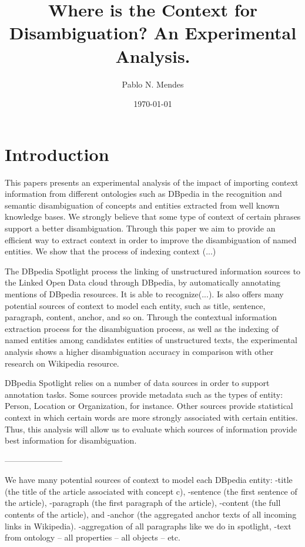 \documentclass[10pt,a4paper]{article}
\title{Where is the Context for Disambiguation? An Experimental Analysis.}
\author{Pablo N. Mendes}
\date{\today}
\begin{document}
\maketitle

\begin{abstract}
\end{abstract}

\section{Introduction}

This papers presents an experimental analysis of the impact of importing context information from different ontologies such as DBpedia in the recognition and semantic disambiguation of concepts and entities extracted from well known knowledge bases. We strongly believe that some type of context  of certain phrases support  a better disambiguation. Through this paper we aim to provide an efficient way to extract context in order to improve the disambiguation of named entities. We show that the process of  indexing context (...)

The DBpedia Spotlight process the linking of unstructured information sources to the Linked Open Data cloud through DBpedia, by automatically annotating mentions of DBpedia resources. It is able to recognize(...). Is also 
offers many potential sources of context to model each entity, such as title, sentence, paragraph, content, anchor, and so on. Through the contextual information extraction process for the disambiguation process, as well as the 
indexing of named entities among candidates entities of unstructured texts, the experimental analysis shows a higher disambiguation  accuracy in comparison with other research on Wikipedia resource.

DBpedia Spotlight relies on a number of data sources in order to support annotation tasks. Some sources provide metadata such as the types of entity: Person, Location or Organization, for instance. Other sources provide statistical context in which certain words are more strongly associated with certain entities. Thus, this analysis will allow us to  evaluate which sources of information provide best information for disambiguation.

---------------------

We have many potential sources of context to model each DBpedia entity:
-title (the title of the article associated with concept c), 
-sentence (the first sentence of the article),
-paragraph (the first paragraph of the article), 
-content (the full contents of the article), and 
-anchor (the aggregated anchor texts of all incoming links in Wikipedia).
-aggregation of all paragraphs like we do in spotlight,
-text from ontology
-- all properties
-- all objects
-- etc.
\end{document}
